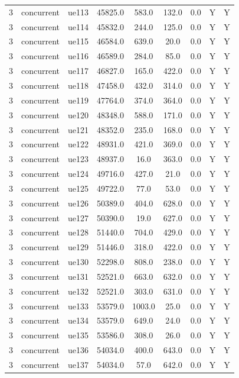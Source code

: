 \begin{table}[ht]
\begin{tabular}{|c|c|c|c|c|c|c|c|c|}
3 & concurrent & ue113 & 45825.0 & 583.0 & 132.0 & 0.0 & Y & Y \\
3 & concurrent & ue114 & 45832.0 & 244.0 & 125.0 & 0.0 & Y & Y \\
3 & concurrent & ue115 & 46584.0 & 639.0 & 20.0 & 0.0 & Y & Y \\
3 & concurrent & ue116 & 46589.0 & 284.0 & 85.0 & 0.0 & Y & Y \\
3 & concurrent & ue117 & 46827.0 & 165.0 & 422.0 & 0.0 & Y & Y \\
3 & concurrent & ue118 & 47458.0 & 432.0 & 314.0 & 0.0 & Y & Y \\
3 & concurrent & ue119 & 47764.0 & 374.0 & 364.0 & 0.0 & Y & Y \\
3 & concurrent & ue120 & 48348.0 & 588.0 & 171.0 & 0.0 & Y & Y \\
3 & concurrent & ue121 & 48352.0 & 235.0 & 168.0 & 0.0 & Y & Y \\
3 & concurrent & ue122 & 48931.0 & 421.0 & 369.0 & 0.0 & Y & Y \\
3 & concurrent & ue123 & 48937.0 & 16.0 & 363.0 & 0.0 & Y & Y \\
3 & concurrent & ue124 & 49716.0 & 427.0 & 21.0 & 0.0 & Y & Y \\
3 & concurrent & ue125 & 49722.0 & 77.0 & 53.0 & 0.0 & Y & Y \\
3 & concurrent & ue126 & 50389.0 & 404.0 & 628.0 & 0.0 & Y & Y \\
3 & concurrent & ue127 & 50390.0 & 19.0 & 627.0 & 0.0 & Y & Y \\
3 & concurrent & ue128 & 51440.0 & 704.0 & 429.0 & 0.0 & Y & Y \\
3 & concurrent & ue129 & 51446.0 & 318.0 & 422.0 & 0.0 & Y & Y \\
3 & concurrent & ue130 & 52298.0 & 808.0 & 238.0 & 0.0 & Y & Y \\
3 & concurrent & ue131 & 52521.0 & 663.0 & 632.0 & 0.0 & Y & Y \\
3 & concurrent & ue132 & 52521.0 & 303.0 & 631.0 & 0.0 & Y & Y \\
3 & concurrent & ue133 & 53579.0 & 1003.0 & 25.0 & 0.0 & Y & Y \\
3 & concurrent & ue134 & 53579.0 & 649.0 & 24.0 & 0.0 & Y & Y \\
3 & concurrent & ue135 & 53586.0 & 308.0 & 26.0 & 0.0 & Y & Y \\
3 & concurrent & ue136 & 54034.0 & 400.0 & 643.0 & 0.0 & Y & Y \\
3 & concurrent & ue137 & 54034.0 & 57.0 & 642.0 & 0.0 & Y & Y \\

\end{tabular}
\end{table}
